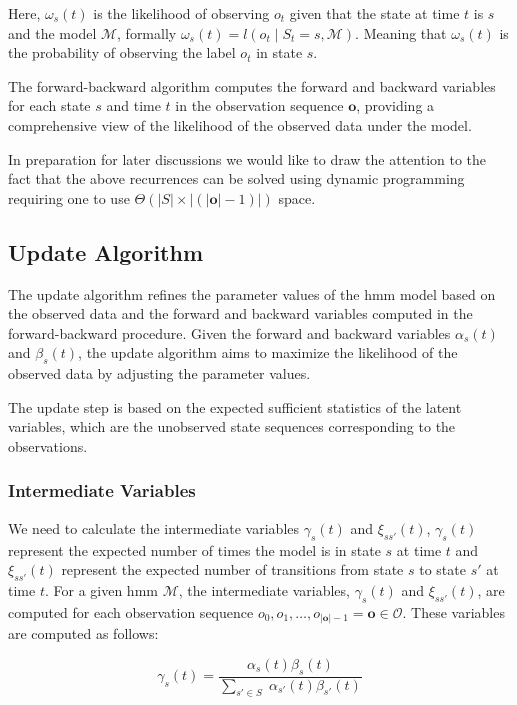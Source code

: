 Here, $\omega_{s}(t)$ is the likelihood of observing $o_t$ given that the state at time $t$ is $s$ and the model $\mathcal{M}$, formally $\omega_s(t) = l(o_t \mid S_t = s, \mathcal{M})$.
Meaning that $\omega_s(t)$ is the probability of observing the label $o_t$ in state $s$.

The forward-backward algorithm computes the forward and backward variables for each state $s$ and time $t$ in the observation sequence $\mathbf{o}$, providing a comprehensive view of the likelihood of the observed data under the model.

In preparation for later discussions we would like to draw the attention to the fact that the above recurrences can be solved using dynamic programming requiring one to use $\Theta(|S|\times|(|\mathbf{o}|-1)|)$ space.


\subsection{Update Algorithm}\label{subsec:update-algorithm}
The update algorithm refines the parameter values of the \gls{hmm} model based on the observed data and the forward and backward variables computed in the forward-backward procedure.
Given the forward and backward variables $\alpha_s(t)$ and $\beta_s(t)$, the update algorithm aims to maximize the likelihood of the observed data by adjusting the parameter values.

The update step is based on the expected sufficient statistics of the latent variables, which are the unobserved state sequences corresponding to the observations.

\subsubsection{Intermediate Variables}
We need to calculate the intermediate variables $\gamma_s(t)$ and $\xi_{ss'}(t)$, $\gamma_s(t)$ represent the expected number of times the model is in state $s$ at time $t$ and $\xi_{ss'}(t)$ represent the expected number of transitions from state $s$ to state $s'$ at time $t$.
For a given \gls{hmm} $\mathcal{M}$, the intermediate variables, $\gamma_s(t)$ and $\xi_{ss'}(t)$, are computed for each observation sequence $o_0, o_1, \dots, o_{|\mathbf{o}|-1} = \mathbf{o} \in \mathcal{O}$.
These variables are computed as follows:

\begin{equation}
    \gamma_s(t) = \frac{\alpha_s(t) \beta_s(t)}{\sum_{s' \in S} \;\alpha_{s'}(t) \beta_{s'}(t)}
    \label{eq:gamma}
\end{equation}

